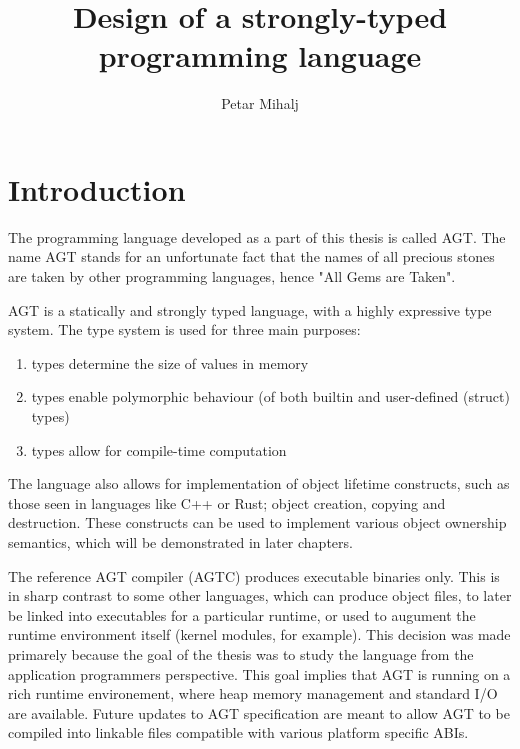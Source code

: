 \documentclass[times, utf8, diplomski]{fer}
\theoremstyle{definition}
\begin{document}

\title{Design of a strongly-typed programming language}

\author{Petar Mihalj}

\maketitle




\tableofcontents

\chapter{Introduction}

The programming language developed as a part of this thesis is called AGT.
The name AGT stands for an unfortunate fact that the names of all precious stones
are taken by other programming languages, hence "All Gems are Taken".

AGT is a statically and strongly typed language, with a highly expressive type system.
The type system is used for three main purposes:

\begin{enumerate}
    \item types determine the size of values in memory
    \item types enable polymorphic behaviour (of both builtin and user-defined (struct) types)
    \item types allow for compile-time computation
\end{enumerate}

The language also allows for implementation of object lifetime constructs, 
such as those seen in languages like C++ or Rust; object creation, copying and destruction.
These constructs can be used to implement various object ownership semantics, 
which will be demonstrated in later chapters.

The reference AGT compiler (AGTC) produces executable binaries only.
This is in sharp contrast to some other languages, which can produce object files, 
to later be linked into executables for a particular runtime, 
or used to augument the runtime environment itself (kernel modules, for example). 
This decision was made primarely because the goal of the thesis was to study the language 
from the application programmers perspective. 
This goal implies that AGT is running on a rich runtime environement, 
where heap memory management and standard I/O are available.
Future updates to AGT specification are meant to allow AGT to be compiled
into linkable files compatible with various platform specific ABIs.
\end{document}
